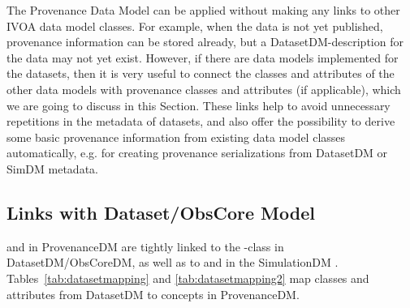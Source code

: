 
The Provenance Data Model can be applied without making any links to other 
IVOA data model classes. For example, when the data is not yet published, provenance information
can be stored already, but a DatasetDM-description for the data may not yet exist.
However, if there are data models implemented for the datasets, then it is 
very useful to connect the classes and attributes of the other data models with provenance classes and attributes (if applicable), which we are going to discuss in this Section. These links help to avoid 
unnecessary repetitions in the metadata of datasets, and also offer the possibility 
to derive some basic provenance information from existing data model classes automatically, e.g. for creating provenance serializations from DatasetDM or SimDM metadata.


\subsection{Links with Dataset/ObsCore Model}
\label{sec:dataset-obscore}

 and  in ProvenanceDM 
are tightly linked to the -class in DatasetDM/ObsCoreDM, as well as to 
 and  in the SimulationDM \citep{std:SimDM}.
Tables~\ref{tab:datasetmapping} and \ref{tab:datasetmapping2} map classes and attributes from DatasetDM
to concepts in ProvenanceDM. 



